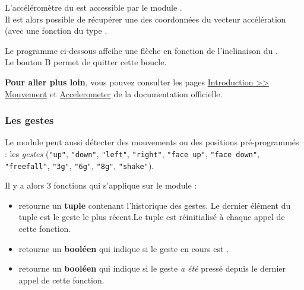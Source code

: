 L'accéléromètre du \mb est accessible par le module .\\
Il est alors possible de récupérer une des coordonnées du vecteur accélération (avec une fonction du type .

\begin{methode}
Le programme ci-dessous affcihe une flèche en fonction de l'inclinaison du \mb.\\
Le bouton B permet de quitter cette boucle.

\end{methode}

\begin{remarque}
\textbf{Pour aller plus loin}, vous pouvez consulter les pages  \href{https://microbit-micropython.readthedocs.io/fr/latest/tutorials/movement.html}{Introduction >> Mouvement} et \href{https://microbit-micropython.readthedocs.io/fr/latest/accelerometer.html}{Accelerometer} de la documentation officielle.
\end{remarque}


\subsubsection{Les gestes}

Le module  peut aussi détecter des mouvements ou des positions pré-programmés : les \emph{gestes} (\texttt{"up"}, \texttt{"down"}, \texttt{"left"}, \texttt{"right"}, \texttt{"face up"}, \texttt{"face down"}, \texttt{"freefall"}, \texttt{"3g"}, \texttt{"6g"}, \texttt{"8g"}, \texttt{"shake"}).

Il y a alors 3 fonctions qui s'applique sur le module  :
\begin{itemize}
    \item {} retourne un \textbf{tuple} contenant l'historique des gestes. Le dernier élément du tuple est le geste le plus récent.Le tuple est réinitialisé à chaque appel de cette fonction.
    \item {} retourne un \textbf{booléen} qui indique si le geste en cours est .
    \item {} retourne un \textbf{booléen} qui indique si le geste  \emph{a été} pressé depuis le dernier appel de cette fonction.
\end{itemize}

